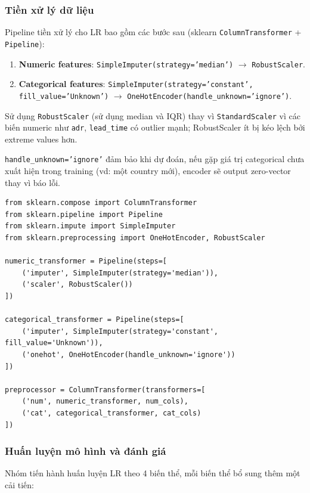 \documentclass[12pt, a4paper]{article}
\begin{document}
\subsubsection{Tiền xử lý dữ liệu}

Pipeline tiền xử lý cho LR bao gồm các bước sau (sklearn \texttt{ColumnTransformer} + \texttt{Pipeline}):

\begin{enumerate}
    \item \textbf{Numeric features}: \texttt{SimpleImputer(strategy='median')} $\to$ \texttt{RobustScaler}.
    \item \textbf{Categorical features}: \texttt{SimpleImputer(strategy='constant', fill\_value='Unknown')} $\to$ \texttt{OneHotEncoder(handle\_unknown='ignore')}.
\end{enumerate}

Sử dụng \texttt{RobustScaler} (sử dụng median và IQR) thay vì \texttt{StandardScaler} vì các biến numeric như \texttt{adr}, \texttt{lead\_time} có outlier mạnh; RobustScaler ít bị kéo lệch bởi extreme values hơn.

\texttt{handle\_unknown='ignore'} đảm bảo khi dự đoán, nếu gặp giá trị categorical chưa xuất hiện trong training (vd: một country mới), encoder sẽ output zero-vector thay vì báo lỗi.

\begin{lstlisting}[caption={Định nghĩa preprocessing pipeline cho LR}]
from sklearn.compose import ColumnTransformer
from sklearn.pipeline import Pipeline
from sklearn.impute import SimpleImputer
from sklearn.preprocessing import OneHotEncoder, RobustScaler

numeric_transformer = Pipeline(steps=[
    ('imputer', SimpleImputer(strategy='median')),
    ('scaler', RobustScaler())
])

categorical_transformer = Pipeline(steps=[
    ('imputer', SimpleImputer(strategy='constant', fill_value='Unknown')),
    ('onehot', OneHotEncoder(handle_unknown='ignore'))
])

preprocessor = ColumnTransformer(transformers=[
    ('num', numeric_transformer, num_cols),
    ('cat', categorical_transformer, cat_cols)
])
\end{lstlisting}

\subsubsection{Huấn luyện mô hình và đánh giá}

Nhóm tiến hành huấn luyện LR theo 4 biến thể, mỗi biến thể bổ sung thêm một cải tiến:
\end{document}
